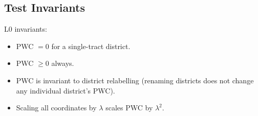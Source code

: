 \subsection{Test Invariants}

L0 invariants:
\begin{itemize}
  \item PWC $= 0$ for a single-tract district.
  \item PWC $\geq 0$ always.
  \item PWC is invariant to district relabelling (renaming districts
    does not change any individual district's PWC).
  \item Scaling all coordinates by $\lambda$ scales PWC by $\lambda^2$.
\end{itemize}
